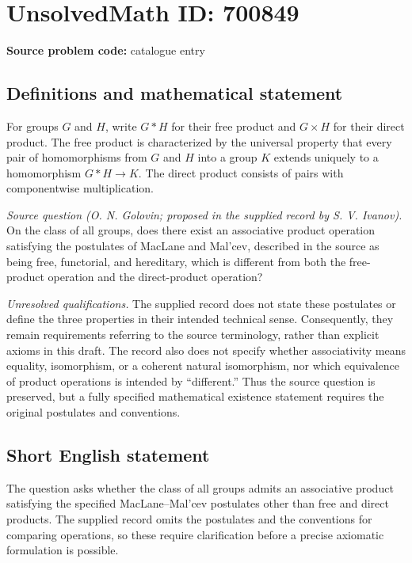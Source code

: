 \documentclass[11pt]{article}
\begin{document}
\section*{UnsolvedMath ID: 700849}
\textbf{Source problem code:} catalogue entry
\subsection{Definitions and mathematical statement}
For groups \(G\) and \(H\), write \(G*H\) for their free product and \(G\times H\) for their direct product. The free product is characterized by the universal property that every pair of homomorphisms from \(G\) and \(H\) into a group \(K\) extends uniquely to a homomorphism \(G*H\to K\). The direct product consists of pairs with componentwise multiplication.

\textit{Source question (O. N. Golovin; proposed in the supplied record by S. V. Ivanov).} On the class of all groups, does there exist an associative product operation satisfying the postulates of MacLane and Mal'cev, described in the source as being free, functorial, and hereditary, which is different from both the free-product operation and the direct-product operation?

\textit{Unresolved qualifications.} The supplied record does not state these postulates or define the three properties in their intended technical sense. Consequently, they remain requirements referring to the source terminology, rather than explicit axioms in this draft. The record also does not specify whether associativity means equality, isomorphism, or a coherent natural isomorphism, nor which equivalence of product operations is intended by ``different.'' Thus the source question is preserved, but a fully specified mathematical existence statement requires the original postulates and conventions.
\subsection{Short English statement}
The question asks whether the class of all groups admits an associative product satisfying the specified MacLane--Mal'cev postulates other than free and direct products. The supplied record omits the postulates and the conventions for comparing operations, so these require clarification before a precise axiomatic formulation is possible.
\end{document}
